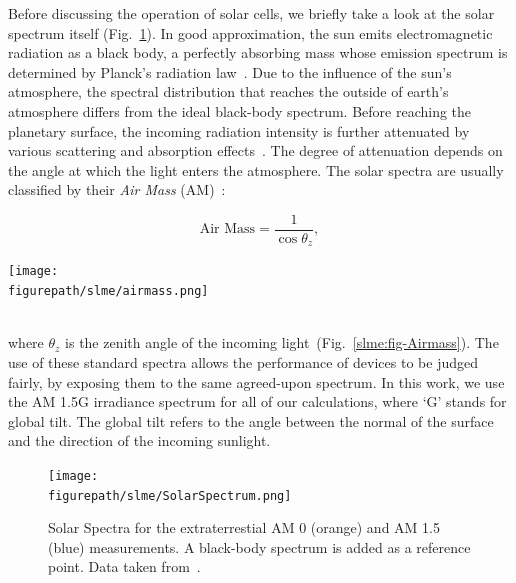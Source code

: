 \begin{refsection}
Before discussing the operation of solar cells, we briefly take a look at the 
solar spectrum itself (Fig.~\ref{slme:fig-solar}). In good approximation, the 
sun emits electromagnetic radiation as a black body, a perfectly absorbing 
mass whose emission spectrum is determined by Planck's radiation 
law~\cite{Planck1901}. Due to the influence of the sun's atmosphere, the 
spectral distribution that reaches the outside of earth's atmosphere differs 
from the ideal black-body spectrum. Before reaching the planetary surface, the 
incoming radiation intensity is further attenuated by various scattering and 
absorption effects~\cite{Bird1986}. The degree of attenuation depends on the 
angle at which the light enters the atmosphere. The solar spectra are usually 
classified by their \textit{Air Mass} (AM)~\cite{Green1981}: 
\begin{minipage}{1\textwidth} 
\begin{minipage}{0.4\textwidth} 
\begin{equation} 
\text{Air Mass} = \frac{1}{\cos \theta_z}, 
\end{equation} 
\end{minipage} 
\begin{minipage}{0.6\textwidth} 
\centering 
\texttt{[image: \\figurepath/slme/airmass.png]} 
\end{minipage} 
\end{minipage} 
\vspace{0.2in}\\ 
where $\theta_z$ is the zenith angle of the incoming 
light~(Fig.~\ref{slme:fig-Airmass}). The use of these standard spectra allows 
the performance of devices to be judged fairly, by exposing them to the same 
agreed-upon spectrum. In this work, we use the AM 1.5G irradiance spectrum for 
all of our calculations, where `G' stands for global tilt. The global tilt 
refers to the angle between the normal of the surface and the direction of the 
incoming sunlight. 
 
\begin{figure}[ht]
\captionsetup{width=0.9\textwidth}
\centering 
\texttt{[image: \\figurepath/slme/SolarSpectrum.png]} 
\caption{\label{slme:fig-solar} Solar Spectra for the extraterrestial AM 0 
(orange) and AM 1.5 (blue) measurements. A black-body spectrum is added as a 
reference point. Data taken from~\cite{International2012}.} 
\end{figure} 
 

\end{refsection}
